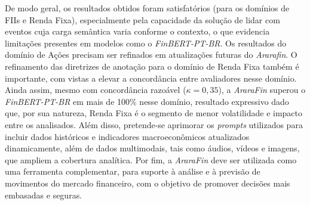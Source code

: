 \documentclass[12pt]{article}
\begin{document}
De modo geral, os resultados obtidos foram satisfatórios (para os domínios de FIIs e Renda Fixa), especialmente pela capacidade da solução de lidar com eventos cuja carga semântica varia conforme 
o contexto, o que evidencia limitações presentes em modelos como o \textit{FinBERT-PT-BR}. Os resultados do domínio de Ações precisam ser refinados em atualizações futuras do \textit{Ararafin}.
O refinamento das diretrizes de anotação para o domínio de Renda Fixa também é importante, com vistas a elevar a concordância entre avaliadores nesse domínio. Ainda assim, mesmo com concordância razoável ($\kappa = 0{,}35$), a \textit{AraraFin} superou o \textit{FinBERT-PT-BR} em mais de 100\% nesse domínio, resultado expressivo dado que, por sua natureza, Renda Fixa é o segmento de menor volatilidade e impacto entre os analisados.
Além disso, pretende-se aprimorar os \textit{prompts} utilizados para incluir dados históricos e indicadores macroeconômicos atualizados dinamicamente, além de dados multimodais, tais como áudios, vídeos e imagens, que ampliem a cobertura analítica. Por fim, a \textit{AraraFin} deve ser utilizada como uma ferramenta complementar, para suporte à análise e à previsão de movimentos do mercado financeiro, com o objetivo de promover decisões mais embasadas e seguras.






\end{document}
